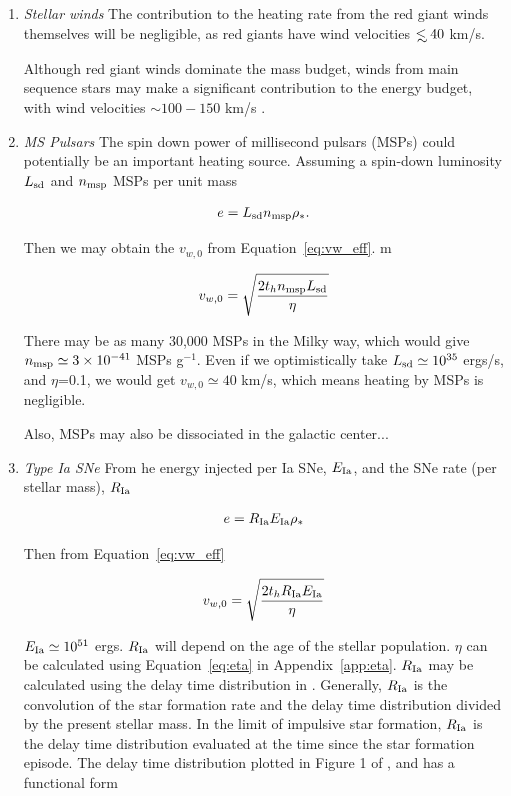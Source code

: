 \documentclass[usenatbib,fleqn]{mn2e}
\newcommand\lsim{\mathrel{\rlap{\lower4pt\hbox{\hskip1pt$\sim$}}
    \raise1pt\hbox{$<$}}}
\newcommand{\rhostar}{\rho_*}
\newcommand{\EIa}{E_{\rm Ia}}
\newcommand{\RateIa}{R_{\rm Ia}}
\newcommand{\vwO}{v_{w,0}}
\begin{document}
\begin{enumerate}
\item \emph{Stellar winds} The contribution to the heating rate from
  the red giant winds themselves will be negligible, as red giants
  have wind velocities $\lsim 40$ km/s.

  Although red giant winds dominate the mass budget, winds from main
  sequence stars may make a significant contribution to the energy
  budget, with wind velocities $\sim 100-150$ km/s
  \citep{NaimanSoares-Furtado+:2013a}.

\item \emph{MS Pulsars} The spin down power of millisecond pulsars
  (MSPs) could potentially be an important heating source. Assuming a
  spin-down luminosity $L_{\rm sd}$ and $n_{\rm msp}$ MSPs per unit
  mass

  \begin{align}
    e=L_{\rm sd} n_{\rm msp} \rhostar.
  \end{align}

  Then we may obtain the $\vwO$ from Equation~\ref{eq:vw_eff}. m

  \begin{align}
    \vwO=\sqrt{\frac{2 t_h n_{\rm msp} L_{\rm sd}}{\eta}}
  \end{align}

  There may be as many 30,000 MSPs in the Milky way, which would give
  $n_{\rm msp}\simeq3 \times 10^{-41} $ MSPs g$^{-1}$. Even if we
  optimistically take $L_{\rm sd}\simeq 10^{35}$ ergs/s, and $\eta$=0.1,
  we would get $\vwO\simeq40$ km/s, which means heating by MSPs is
  negligible.

  Also, MSPs may also be dissociated in the galactic center...

\item \emph{Type Ia SNe} From he energy injected per Ia SNe,
  $E_{\rm Ia}$, and the SNe rate (per stellar mass), $R_{\rm Ia}$

  \begin{align}
    e=R_{\rm Ia} E_{\rm Ia} \rhostar
  \end{align}

  Then from Equation~\ref{eq:vw_eff}

  \begin{align}
    \vwO=\sqrt{\frac{2 t_h R_{\rm Ia} E_{\rm Ia}}{\eta}} \label{eq:vw_sne}
  \end{align}

  $\EIa \simeq10^{51}$ ergs. $\RateIa$ will depend on the age of the
  stellar population. $\eta$ can be calculated using
  Equation~\ref{eq:eta} in Appendix~\ref{app:eta}. $\RateIa$ may be
  calculated using the delay time distribution in
  \citealt{MaozMannucci+:2012a}. Generally, $\RateIa$ is the
  convolution of the star formation rate and the delay time
  distribution divided by the present stellar mass. In the limit of
  impulsive star formation, $\RateIa$ is the delay time distribution
  evaluated at the time since the star formation episode. The delay
  time distribution plotted in Figure 1 of
  \citealt{MaozMannucci+:2012a}, and has a functional form


\end{enumerate}
\end{document}
